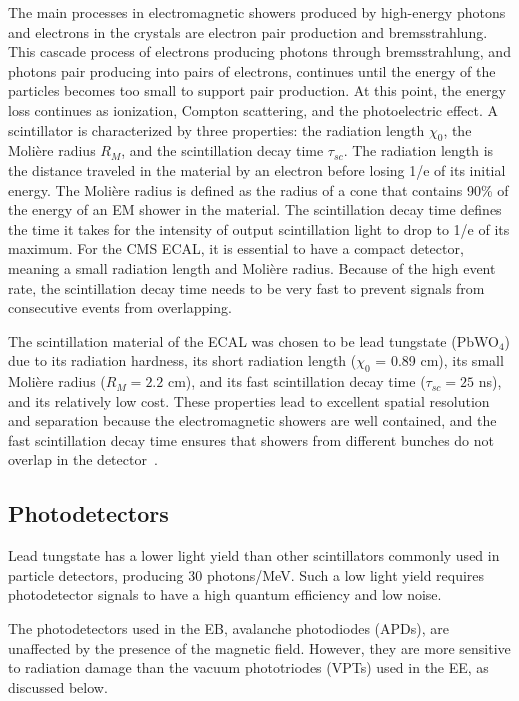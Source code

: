 The main processes in electromagnetic showers produced by high-energy photons and electrons in the crystals are electron pair production and bremsstrahlung. This cascade process of electrons producing photons through bremsstrahlung, and photons pair producing into pairs of electrons, continues until the energy of the particles becomes too small to support pair production. At this point, the energy loss continues as ionization, Compton scattering, and the photoelectric effect. A scintillator is characterized by three properties: the radiation length $\chi_0$, the Moli\`ere radius $R_M$, and the scintillation decay time $\tau_{sc}$. The radiation length is the distance traveled in the material by an electron before losing 1/e of its initial energy. The Moli\`ere radius is defined as the radius of a cone that contains 90\% of the energy of an EM shower in the material. The scintillation decay time defines the time it takes for the intensity of output scintillation light to drop to 1/e of its maximum. For the CMS ECAL, it is essential to have a compact detector, meaning a small radiation length and Moli\`ere radius. Because of the high event rate, the scintillation decay time needs to be very fast to prevent signals from consecutive events from overlapping.

The scintillation material of the ECAL was chosen to be lead tungstate (PbWO$_4$) due to its radiation hardness, its short
radiation length ($\chi_0$ = 0.89 cm), its small Moli\`ere radius ($R_M = 2.2$ cm), and its fast scintillation decay time ($\tau_{sc} = 25$ ns), and its relatively low cost. These properties lead to excellent spatial resolution and separation because the electromagnetic showers are well
contained, and the fast scintillation decay time ensures that showers from different bunches do not overlap in the detector~\cite{ecal:2013}.

\subsection{Photodetectors}

Lead tungstate has a lower light yield than other scintillators commonly used in particle detectors, producing 30 photons/MeV. Such a low light yield requires photodetector signals to have a high quantum efficiency and low noise.

The photodetectors used in the EB, avalanche photodiodes (APDs), are unaffected by the presence of the magnetic field. However, they are more sensitive to radiation damage than the vacuum phototriodes (VPTs) used in the EE, as discussed below.

